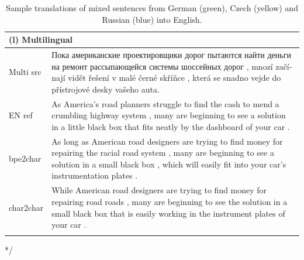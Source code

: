 \documentclass[11pt,letterpaper]{article}
\newcommand{\tb}{\textbf}
\newcommand{\clr}{\color{Red}}
\newcommand{\cly}{\color{YellowOrange}}
\newcommand{\clb}{\color{Cerulean}}
\begin{document}
\begin{table}[t]
\begin{tabular}{p{1.4cm}|p{14.6cm}}
\multicolumn{2}{l}{\tb{(l) Multilingual}} \\ \hline \hline
Multi src  & \vspace{-0.85em} {\clb\foreignlanguage{russian}{Пока американские проектировщики дорог пытаются найти деньги на ремонт рассыпающейся системы шоссейных дорог}} , {\cly\foreignlanguage{czech}{mnozí začínají vidět řešení v malé černé skříňce , která se snadno vejde do přístrojové desky vašeho auta}}.\\ \hline
EN ref  & \vspace{-0.85em} {\clr As America's road planners struggle to find the cash to mend a crumbling highway system} , many are beginning to see a solution in a little black box that fits neatly by the dashboard of your car . \\ \hline
bpe2char & \vspace{-0.85em} {\clr As long as American road designers are trying to find money for repairing the racial road system} , many are beginning to see a solution in a small black box , which will easily fit into your car's instrumentation plates . \\ \hline
char2char & \vspace{-0.85em} {\clr While American road designers are trying to find money for repairing road roads} , many are beginning to see the solution in a small black box that is easily working in the instrument plates of your car . \\ \hline
\multicolumn{2}{l}{}       \\

\end{tabular}
\vspace{-8mm}
\caption{Sample translations of mixed sentences from German (green), Czech (yellow) and Russian (blue) into English.}
\label{table:multilingual}
\normalsize
\end{table}
*/
\end{document}
